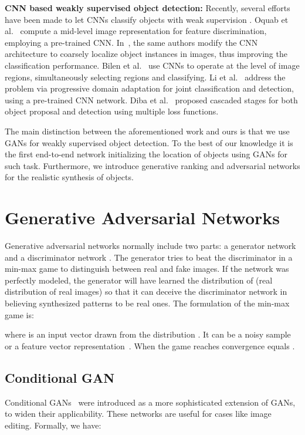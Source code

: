 \documentclass[runningheads]{llncs}
\begin{document}
\textbf{CNN based weakly supervised object detection:} Recently, several efforts have been made to let CNNs classify objects with weak supervision \cite{Contextlocnet,bilen16,li16}. Oquab et al.~\cite{Oquab14} compute a mid-level image representation for feature discrimination, employing a pre-trained CNN. In~\cite{laptev15}, the same authors modify the CNN architecture to coarsely localize object instances in images, thus improving the classification performance.  Bilen et al.~\cite{bilen16} use CNNs to operate at the level of image regions, simultaneously selecting regions and classifying. Li et al.~\cite{li16} address the problem via progressive domain adaptation for joint  classification and detection, using a pre-trained CNN network.  Diba et al.~\cite{diba} proposed cascaded stages for both object proposal and detection using multiple loss functions.



The main distinction between the aforementioned work and ours is that we use GANs for weakly supervised object detection. To the best of our knowledge it is the first end-to-end network initializing the location of objects using GANs for such task. Furthermore, we introduce generative ranking and adversarial networks for the realistic synthesis of objects.





\section{Generative Adversarial Networks} \label{sec:gan}

Generative adversarial networks normally include two parts: a generator network  and a discriminator network . The generator tries to beat the discriminator in a min-max game to distinguish between real and fake images. If the network was perfectly modeled, the generator will have learned the distribution of  (real distribution of real images) so that it can deceive the discriminator network in believing synthesized patterns to be real ones. The formulation of the min-max game is:

where  is an input vector drawn from the distribution . It can be a noisy sample~\cite{dosovitskiy,goodfellow} or a feature vector representation~\cite{nguyen}. When the game reaches convergence  equals .  

\subsection*{Conditional GAN}
Conditional GANs~\cite{cgan,perarnau} were introduced as a more sophisticated extension of GANs, to widen their applicability. These networks are useful for cases like image editing.  Formally, we have:
\end{document}
